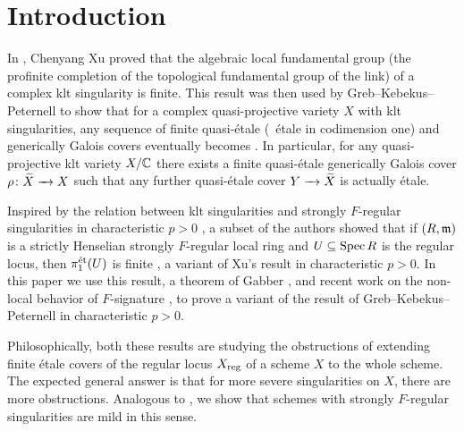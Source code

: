 \documentclass[12pt]{amsart}
\numberwithin{equation}{theorem}
\renewcommand{\:}{\colon}
\theoremstyle{theorem}
\begin{document}
\maketitle

\section{Introduction}

In \cite{XuFinitenessOfFundGroups}, Chenyang Xu proved that the algebraic local fundamental group (the profinite completion of the topological fundamental group of the link) of a complex klt singularity is finite.
This result was then used by Greb--Kebekus--Peternell \cite{GrebKebekusPeternellEtaleFundamental} to show that for a complex quasi-projective variety $X$ with klt singularities, any sequence of finite quasi-\'etale (\ie~\'etale in codimension one) and generically Galois covers eventually becomes \etale.
In particular, for any quasi-projective klt variety $X/\mathbb {C}$ there exists a finite quasi-\'etale generically Galois cover $\rho\colon \widetilde X \xrightarrow{\ \ } X$ such that any further quasi-\'etale cover $Y \xrightarrow{\ \ } \widetilde X$ is actually \'etale.

Inspired by the relation between klt singularities and strongly $F$-regular singularities in characteristic $p > 0$ \cite{HaraWatanabeFRegFPure}, a subset of the authors showed that if $(R, \mathfrak{m})$ is a strictly Henselian strongly $F$-regular local ring and $U \subseteq \operatorname{{Spec}} R$ is the regular locus, then $\pi_1^{\textnormal{{\'e}t}}(U)$ is finite \cite{CarvajalSchwedeTuckerEtaleFundFsignature}, a variant of Xu's result in characteristic $p > 0$.  In this paper we use this result, a theorem of Gabber \cite{TravauxdeGabber}, and recent work on the non-local behavior of $F$-signature \cite{deStefaniPolstraYao-Globalizing}, to prove a variant of the result of Greb--Kebekus--Peternell in characteristic $p > 0$.

Philosophically, both these results are studying the obstructions of extending finite \'etale covers of the regular locus $X_{\operatorname{{reg}}}$ of a scheme $X$ to the whole scheme.  The expected general answer is that for more severe singularities on $X$, there are more obstructions.
Analogous to \cite{GrebKebekusPeternellEtaleFundamental}, we show that schemes with strongly $F$-regular singularities are mild in this sense.
\end{document}
